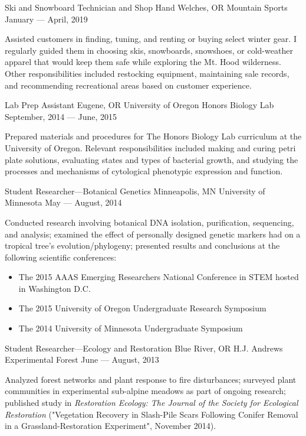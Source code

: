 \showoff
{Ski and Snowboard Technician and Shop Hand}
{Welches, OR}
{Mountain Sports}
{January --- April, 2019}

Assisted customers in finding, tuning, and renting or buying select winter gear. I regularly guided them in choosing skis, snowboards, snowshoes, or cold-weather apparel that would keep them safe while exploring the Mt. Hood wilderness. Other responsibilities included restocking equipment, maintaining sale records, and recommending recreational areas based on customer experience. 

\myBreak

\showoff
{Lab Prep Assistant}
{Eugene, OR}
{University of Oregon Honors Biology Lab}
{September, 2014 --- June, 2015}

Prepared materials and procedures for The Honors Biology Lab curriculum at the University of Oregon. Relevant responsibilities included making and curing petri plate solutions, evaluating states and types of bacterial growth, and studying the processes and mechanisms of cytological phenotypic expression and function.

\myBreak

\showoff
{Student Researcher---Botanical Genetics}
{Minneapolis, MN}
{University of Minnesota}
{May --- August, 2014}

Conducted research involving botanical DNA isolation, purification, sequencing, and analysis; examined the effect of personally designed genetic markers had on a tropical tree’s evolution/phylogeny; presented results and conclusions at the following scientific conferences:
\begin{itemize}[label=$\triangleright$]
\item{The 2015 AAAS Emerging Researchers National Conference in STEM hosted in Washington D.C.}
\item{The 2015 University of Oregon Undergraduate Research Symposium}
\item{The 2014 University of Minnesota Undergraduate Symposium}
\end{itemize}

\myBreak

\showoff
{Student Researcher---Ecology and Restoration}
{Blue River, OR}
{H.J. Andrews Experimental Forest}
{June --- August, 2013}

Analyzed forest networks and plant response to fire disturbances; surveyed plant communities in experimental sub-alpine meadows as part of ongoing research; published study in \textit{Restoration Ecology: The Journal of the Society for Ecological Restoration} ("Vegetation Recovery in Slash-Pile Scars Following Conifer Removal in a Grassland-Restoration Experiment", November 2014).

